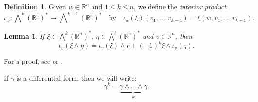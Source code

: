 \documentclass[intlimits,12pt,reqno]{amsart}
\newcommand{\R}{\mathbb R}
\numberwithin{equation}{section}
\newtheorem{lemma}[theorem]{Lemma}
\theoremstyle{definition}
\newtheorem{definition}[theorem]{Definition}
\newcommand{\Ep}{\bigwedge\nolimits}
\begin{document}
\begin{definition}
Given $w\in\R^n$ and $1\leq k\leq n$, we define the {\em interior product}
$$
\iota_w:\Ep^k(\R^n)^*\to \Ep^{k-1}(\R^n)^*
\quad
\text{by}
\quad
\iota_w(\xi)(v_1,\ldots,v_{k-1})=\xi(w,v_1,\ldots,v_{k-1}).
$$
\end{definition}
\begin{lemma}
\label{T10}
If $\xi\in\Ep^k(\R^n)^*$, $\eta\in\Ep^\ell(\R^n)^*$ and $v\in\R^n$, then
$$
\iota_v(\xi\wedge\eta)=\iota_v(\xi)\wedge\eta+(-1)^k\xi\wedge\iota_v(\eta).
$$
\end{lemma}
For a proof, see \cite[Lemma~14.13]{Lee} or \cite[Proposition~2.12]{warner}.

If $\gamma$ is a differential form, then we will write:
$$
\gamma^k=\underbrace{\gamma\wedge\ldots\wedge\gamma}_{k}.
$$
\end{document}
